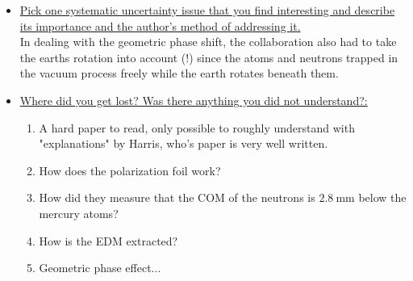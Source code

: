 \documentclass[12pt]{article}
\begin{document}
\begin{itemize}
	\item \ul{Pick one systematic uncertainty issue that you find interesting and describe its importance and the author's method of addressing it.}\\
	\noindent
	In dealing with the geometric phase shift, the collaboration also had to take the earths rotation into account (!) since the atoms and neutrons trapped in the vacuum process freely while the earth rotates beneath them. 
	
	\item \ul{Where did you get lost? Was there anything you did not understand?:} \\
	\noindent
	\begin{enumerate}
		\item A hard paper to read, only possible to roughly understand with "explanations" by Harris, who's paper is very well written.
		\item How does the polarization foil work?
		\item How did they measure that the COM of the neutrons is $\SI{2.8}{\milli\meter}$ below the mercury atoms?
		\item How is the EDM extracted?
		\item Geometric phase effect...
	\end{enumerate}
	
\end{itemize}
\end{document}
